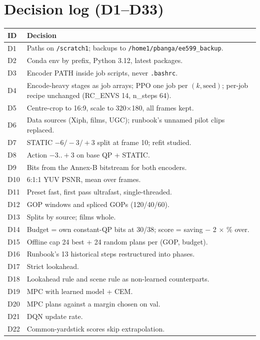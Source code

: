 \documentclass[10pt,a4paper]{article}
\newcommand{\code}[1]{\texttt{\small #1}}
\begin{document}
\section{Decision log (D1--D33)}
\begin{longtable}{p{1cm}p{15.4cm}}
\toprule
ID & Decision \\\midrule
D1 & Paths on \code{/scratch1}; backups to \code{/home1/pbanga/ee599\_backup}. \\
D2 & Conda env by prefix, Python 3.12, latest packages. \\
D3 & Encoder PATH inside job scripts, never \code{.bashrc}. \\
D4 & Encode-heavy stages as job arrays; PPO one job per $(k,\text{seed})$; per-job recipe unchanged (RC\_ENVS 14, n\_steps 64). \\
D5 & Centre-crop to 16:9, scale to 320$\times$180, all frames kept. \\
D6 & Data sources (Xiph, films, UGC); runbook's unnamed pilot clips replaced. \\
D7 & STATIC $-6/-3/+3$ split at frame 10; refit studied. \\
D8 & Action $-3..+3$ on base QP + STATIC. \\
D9 & Bits from the Annex-B bitstream for both encoders. \\
D10 & 6:1:1 YUV PSNR, mean over frames. \\
D11 & Preset fast, first pass ultrafast, single-threaded. \\
D12 & GOP windows and spliced GOPs (120/40/60). \\
D13 & Splits by source; films whole. \\
D14 & Budget = own constant-QP bits at 30/38; score = saving $-$ 2 $\times$ \% over. \\
D15 & Offline cap 24 best + 24 random plans per (GOP, budget). \\
D16 & Runbook's 13 historical steps restructured into phases. \\
D17 & Strict lookahead. \\
D18 & Lookahead rule and scene rule as non-learned counterparts. \\
D19 & MPC with learned model + CEM. \\
D20 & MPC plans against a margin chosen on val. \\
D21 & DQN update rate. \\
D22 & Common-yardstick scores skip extrapolation. \\

\end{longtable}
\end{document}
